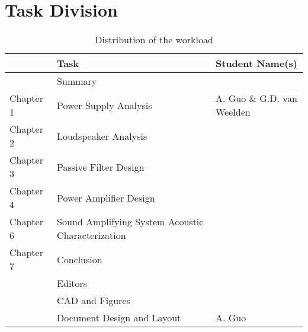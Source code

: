 \chapter{Task Division}


\begin{table}[htb]
    \setlength\extrarowheight{4pt}
    \centering
    \caption{Distribution of the workload}
    \label{tab:taskdivision}
    \begin{tabularx}{\textwidth}{lXX}
        \toprule
        & Task & Student Name(s) \\
        \midrule
        & Summary & \\
        Chapter 1 & Power Supply Analysis & A. Guo \& G.D. van Weelden \\
        Chapter 2 & Loudspeaker Analysis & \\
        Chapter 3 & Passive Filter Design & \\
        Chapter 4 & Power Amplifier Design & \\
        Chapter 6 & Sound Amplifying System Acoustic Characterization & \\
        Chapter 7 & Conclusion &  \\
        \midrule
        & Editors & \\
        & CAD and Figures & \\
        & Document Design and Layout & A. Guo \\
        \bottomrule
    \end{tabularx}
\end{table}
